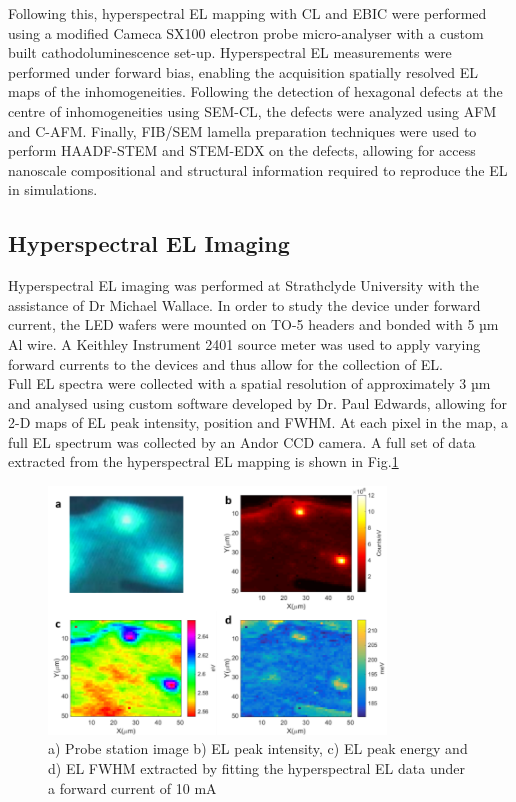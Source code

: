 Following this, hyperspectral EL mapping with CL and EBIC were performed using a modified Cameca SX100 electron probe micro-analyser with a custom built cathodoluminescence set-up. Hyperspectral EL measurements were performed under forward bias, enabling the acquisition spatially resolved EL maps of the inhomogeneities. Following the detection of hexagonal defects at the centre of inhomogeneities using SEM-CL, the defects were analyzed using AFM and C-AFM. Finally, FIB/SEM lamella preparation techniques were used to perform HAADF-STEM and STEM-EDX on the defects, allowing for access nanoscale compositional and structural information required to reproduce the EL in simulations.


\subsection{Hyperspectral EL Imaging}
Hyperspectral EL imaging was performed at Strathclyde University with the assistance of Dr Michael Wallace. In order to study the device under forward current, the LED wafers were mounted on TO-5 headers and bonded with 5 µm Al wire. A Keithley Instrument 2401 source meter was used to apply varying forward currents to the devices and thus allow for the collection of EL. \\
Full EL spectra were collected with a spatial resolution of approximately 3 µm and analysed using custom software developed by Dr. Paul Edwards, allowing for 2-D maps of EL peak intensity, position and FWHM. At each pixel in the map, a full EL spectrum was collected by an Andor CCD camera. A full set of data extracted from the hyperspectral EL mapping is shown in Fig.\ref{ELfull}

\begin{figure}[!ht]
	\centering
	\includegraphics[width=0.8\textwidth]{Figs/Ch3/ELfull}
	\caption[h] {a) Probe station image b) EL peak intensity, c) EL peak energy and d) EL FWHM extracted by fitting the hyperspectral EL data under a forward current of 10 mA}
	\label{ELfull}
\end{figure}

